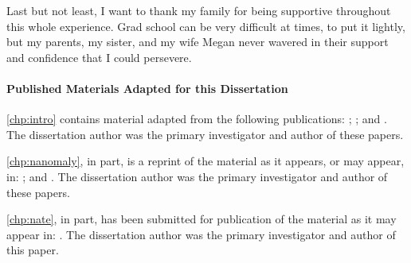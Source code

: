 \begin{acknowledgements}
  Last but not least, I want to thank my family for being supportive
  throughout this whole experience. Grad school can be very difficult at
  times, to put it lightly, but my parents, my sister, and my wife Megan
  never wavered in their support and confidence that I could persevere.

  \paragraph{Published Materials Adapted for this Dissertation}
  \autoref{chp:intro} contains material adapted from the following
  publications:
  ;
  ; and
  .
  The dissertation author was the primary investigator and author of
  these papers.

  \autoref{chp:nanomaly}, in part, is a reprint of the material
  as it appears, or may appear, in:
  ; and
  .
  The dissertation author was the primary investigator and author of
  these papers.

  \autoref{chp:nate}, in part, has been submitted for publication of
  the material as it may appear in:
  .
  The dissertation author was the primary investigator and author of
  this paper.

\end{acknowledgements}


